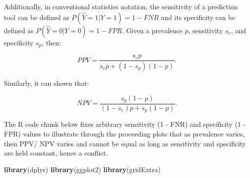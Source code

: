 \documentclass[12pt, twoside]{amherstthesis}
\newenvironment{Shaded}{\begin{snugshade}}{\end{snugshade}}
\newcommand{\FunctionTok}[1]{\textcolor[rgb]{0.13,0.29,0.53}{\textbf{#1}}}
\newcommand{\NormalTok}[1]{#1}
\begin{document}
\noindent Additionally, in conventional statistics notation, the sensitivity of a prediction tool can be defined as \(P(\hat{Y}=1|Y=1) = 1 - FNR\) and its specificity can be defined as \(P(\hat{Y}=0|Y=0) = 1 - FPR\). Given a prevalence \(p\), sensitivity \(s_e\), and specificity \(s_p\), then:

\[PPV = \frac{s_ep}{s_ep + (1-s_p)(1-p)}.\]

\noindent Similarly, it can shown that:

\[NPV = \frac{s_p(1-p)}{(1-s_e)p + s_p(1-p)}.\]

\noindent The R code chunk below fixes arbitrary sensitivity (1 - FNR) and specificity (1 - FPR) values to illustrate through the proceeding plots that as prevalence varies, then PPV/ NPV varies and cannot be equal as long as sensitivity and specificity are held constant, hence a conflict.
\begin{Shaded}
\begin{Highlighting}[]
\FunctionTok{library}\NormalTok{(dplyr)}
\FunctionTok{library}\NormalTok{(ggplot2)}
\FunctionTok{library}\NormalTok{(gridExtra)}
\end{Highlighting}
\end{Shaded}
\end{document}
